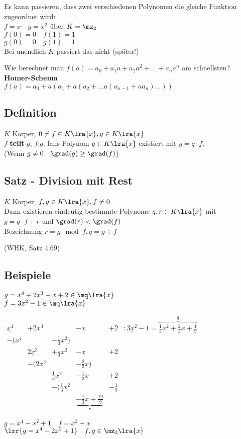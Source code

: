 			Es kann passieren, dass zwei verschiedenen Polynomen die gleiche Funktion zugeordnet wird:\\
			$f=x\quad g=x^2$ über $K=\mz_2$\\
			$f(0)=0\quad f(1)=1$\\
			$g(0)=0\quad g(1)=1$\\
			Bei unendlich $K$ passiert das nicht (später!)
		\item Wie berechnet man $f(a)=a_0+a_1a+a_2a^2+\dots +a_na^n$ am schnellsten?\\
			\textbf{Homer-Schema}\\
			$f(a) = a_0+a(a_1+a(a_2+\dots a(a_{n-1}+aa_n)\dots))$
	\subExEnd
\subsection{Definition}
	$K$ Körper, $0\neq f\in K\lra{x}, g\in K\lra{x}$\\
	$f$ \textbf{teilt} $g$, $f|g$, falls Polynom $q\in K\lra{x}$ existiert mit $g=q\cdot f$.\\
	(Wenn $g\neq 0\quad \grad(g)\geq\grad(f)$)
\subsection{Satz - Division mit Rest}
	$K$ Körper, $f,g\in K\lra{x}, f\neq 0$\\
	Dann existieren eindeutig bestimmte Polynome $q,r\in K\lra{x}$ mit\\
	$g=q\cdot f+r$ und $\grad(r) <\grad(f)$\\
	Bezeichnung $r=g\mod f, q=g\div f$
	\begin{flushright}
		(WHK, Satz 4.69)
	\end{flushright}
\subsection{Beispiele}
		\item $g=x^4+2x^3-x+2\in\mq\lra{x}$\\
			$f=3x^2-1\in\mq\lra{x}$
			
			$\begin{array}{rrrrrl}
				\underline{x^4}	&+2x^3				&						&-x				&+2			&: \underline{3x^2}-1=\overbrace{\frac{1}{3}x^2+\frac{2}{3}x+\frac{1}{9}}^{q}\\
				-(x^4			&					&-\frac{1}{3}x^2)		&				&&\\
								&\underline{2x^3}	&+\frac{1}{3}x^2			&-x			&+2&\\
								&-(2x^3				&						&-\frac{2}{3}x)	&&\\
								&					&\frac{1}{3}x^2			&-\frac{1}{3}x	&+2	&\\
								&					&-(\frac{1}{3}x^2		&				&-\frac{1}{9}	&\\
								&					&						&\underbrace{-\frac{1}{3}x+\frac{19}{9}}_r&
			\end{array}$	
		\item $g=x^4-x^2+1\quad f=x^2+x$\\
			$\lrr{g=x^4+2x^2+1}\quad f,g\in \mz_3\lra{x}$
			
